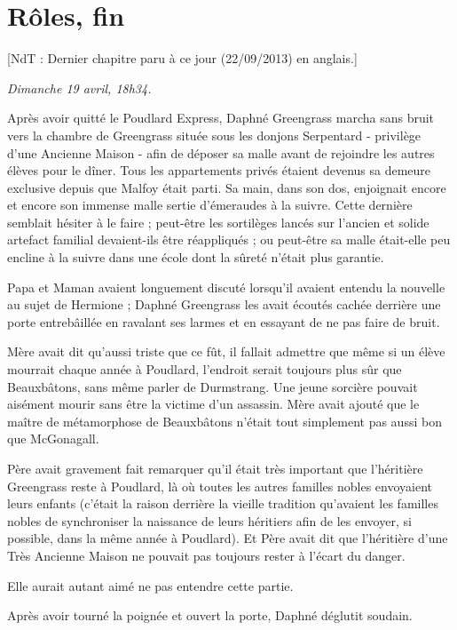 
\chapter{Rôles, fin}

[NdT : Dernier chapitre paru à ce jour (22/09/2013) en anglais.]

\emph{Dimanche 19 avril, 18h34.} 

Après avoir quitté le Poudlard Express, Daphné Greengrass marcha sans bruit vers la chambre de Greengrass située sous les donjons Serpentard - privilège d'une Ancienne Maison - afin de déposer sa malle avant de rejoindre les autres élèves pour le dîner. Tous les appartements privés étaient devenus sa demeure exclusive depuis que Malfoy était parti. Sa main, dans son dos, enjoignait encore et encore son immense malle sertie d'émeraudes à la suivre. Cette dernière semblait hésiter à le faire ; peut-être les sortilèges lancés sur l'ancien et solide artefact familial devaient-ils être réappliqués ; ou peut-être sa malle était-elle peu encline à la suivre dans une école dont la sûreté n'était plus garantie.

Papa et Maman avaient longuement discuté lorsqu'il avaient entendu la nouvelle au sujet de Hermione ; Daphné Greengrass les avait écoutés cachée derrière une porte entrebâillée en ravalant ses larmes et en essayant de ne pas faire de bruit.

Mère avait dit qu'aussi triste que ce fût, il fallait admettre que même si un élève mourrait chaque année à Poudlard, l'endroit serait toujours plus sûr que Beauxbâtons, sans même parler de Durmstrang. Une jeune sorcière pouvait aisément mourir sans être la victime d'un assassin. Mère avait ajouté que le maître de métamorphose de Beauxbâtons n'était tout simplement pas aussi bon que McGonagall.

Père avait gravement fait remarquer qu'il était très important que l'héritière Greengrass reste à Poudlard, là où toutes les autres familles nobles envoyaient leurs enfants (c'était la raison derrière la vieille tradition qu'avaient les familles nobles de synchroniser la naissance de leurs héritiers afin de les envoyer, si possible, dans la même année à Poudlard). Et Père avait dit que l'héritière d'une Très Ancienne Maison ne pouvait pas toujours rester à l'écart du danger.

Elle aurait autant aimé ne pas entendre cette partie.

Après avoir tourné la poignée et ouvert la porte, Daphné déglutit soudain.

